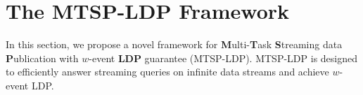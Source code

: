 \section{The MTSP-LDP Framework}
\label{sec:method}

In this section, we propose a novel framework for \textbf{M}ulti-\textbf{T}ask
\textbf{S}treaming data \textbf{P}ublication with $w$-event \textbf{LDP}
guarantee (MTSP-LDP).
MTSP-LDP is designed to efficiently answer streaming queries on infinite data
streams and achieve $w$-event LDP.



% 








